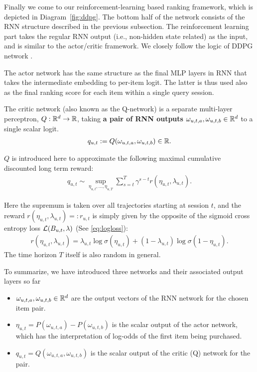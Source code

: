 Finally we come to our reinforcement-learning based ranking framework, which is depicted in Diagram~\ref{fig:ddpg}. The bottom half of the network consists of the RNN structure described in the previous subsection. The reinforcement learning part takes the regular RNN output (i.e., non-hidden state related) as the input, and is similar to the actor/critic framework. We closely follow the logic of DDPG network \cite{lillicrap2015continuous}.

The actor network has the same structure as the final MLP layers in RNN that takes the intermediate embedding to per-item logit. The latter is thus used also as the final ranking score for each item within a single query session. 

The critic network (also known as the Q-network) is a separate multi-layer perceptron, $Q: \mathbb{R}^d \to \mathbb{R}$, taking \textbf{a pair of RNN outputs} $\omega_{u, t, a}, \omega_{u, t, b} \in \mathbb{R}^d$ to a single scalar logit. 
\begin{align*}
    q_{u, t} := Q(\omega_{u, t, a}, \omega_{u, t, b}) \in \mathbb{R}.
\end{align*}

$Q$ is introduced here to approximate the following maximal cumulative discounted long term reward:
\begin{align*}
    q_{u, t} \sim \sup_{\eta_{u, t}, \ldots, \eta_{u, T}} \sum_{s = t}^T \gamma^{s - t} r(\eta_{u,  t}, \lambda_{u, t}).
\end{align*}

Here the supremum is taken over all trajectories starting at session $t$, and the reward $r(\eta_{u,t},\lambda_{u, t}) =: r_{u, t}$ is simply given by the opposite of the sigmoid cross entropy loss $\mathcal{L}(B_{u, t}, \lambda)$ (See \eqref{eq:logloss}):
\begin{align} \label{eq:reward_definition}
    r(\eta_{u, t}, \lambda_{u, t}) = \lambda_{u, t} \log \sigma(\eta_{u, t}) + (1 - \lambda_{u, t}) \log \sigma(1 - \eta_{u, t}).
\end{align}
The time horizon $T$ itself is also random in general.

To summarize, we have introduced three networks and their associated output layers so far
\begin{itemize}
    \item $\omega_{u, t, a}, \omega_{u, t, b} \in \mathbb{R}^d$ are the output vectors of the RNN network for the chosen item pair.
    \item $\eta_{u, t} = P(\omega_{u, t, a}) - P(\omega_{u, t, b})$ is the scalar output of the actor network, which has the interpretation of log-odds of the first item being purchased.
    \item $q_{u, t} = Q(\omega_{u, t, a}, \omega_{u, t, b})$ is the scalar output of the critic (Q) network for the pair.
\end{itemize}


